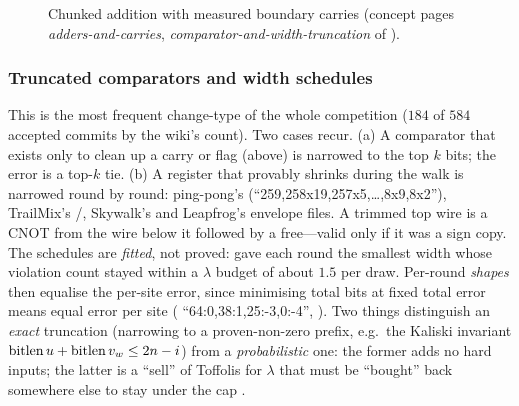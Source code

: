 \begin{figure}[H]
\centering
{}
\caption{Chunked addition with measured boundary carries (concept pages \emph{adders-and-carries}, \emph{comparator-and-width-truncation} of \cite{ecdsafail-wiki}).}
\label{fig:chunked}
\end{figure}

\subsubsection{Truncated comparators and width schedules}\label{sec:truncation}

This is the most frequent change-type of the whole competition ($184$ of $584$ accepted commits by the wiki's count). Two cases recur. (a) A comparator that exists only to clean up a carry or flag (above) is narrowed to the top $k$ bits; the error is a top-$k$ tie. (b) A register that provably shrinks during the walk is narrowed round by round: ping-pong's  (``259,258x19,257x5,\dots,8x9,8x2''), TrailMix's /, Skywalk's and Leapfrog's envelope files. A trimmed top wire is a CNOT from the wire below it followed by a free---valid only if it was a sign copy. The schedules are \emph{fitted}, not proved:  gave each round the smallest width whose violation count stayed within a $\lambda$ budget of about $1.5$ per draw. Per-round \emph{shapes} then equalise the per-site error, since minimising total bits at fixed total error means equal error per site ( ``64:0,38:1,25:-3,0:-4'', ). Two things distinguish an \emph{exact} truncation (narrowing to a proven-non-zero prefix, e.g.\ the Kaliski invariant $\operatorname{bitlen} u+\operatorname{bitlen} v_w\le2n-i$) from a \emph{probabilistic} one: the former adds no hard inputs; the latter is a ``sell'' of Toffolis for $\lambda$ that must be ``bought'' back somewhere else to stay under the cap \cite{ecdsafail-wiki}.

